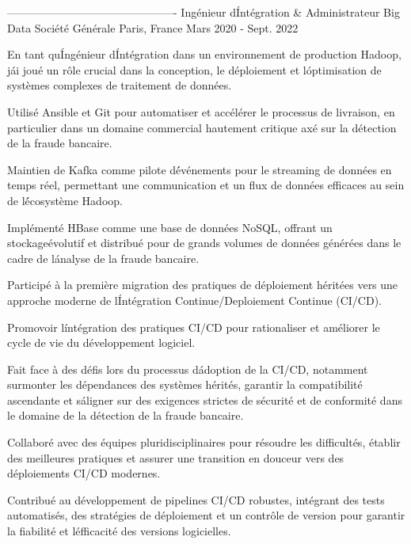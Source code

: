 \begin{cventries}
----------------------------------------------
  \cventry
    {Ingénieur d\' Intégration \& Administrateur Big Data} %
    {Société Générale} %
    {Paris, France} %
    {Mars 2020 - Sept. 2022} %
    {
      \begin{cvitems} %
        \item {En tant qu\' Ingénieur d\' Intégration dans un environnement de production Hadoop, j\' ai joué un rôle crucial dans la conception, le déploiement et l\' optimisation de systèmes complexes de traitement de données.}
        \item {Utilisé Ansible et Git pour automatiser et accélérer le processus de livraison, en particulier dans un domaine commercial hautement critique axé sur la détection de la fraude bancaire.}
        \item {Maintien de Kafka comme pilote d\' événements pour le streaming de données en temps réel, permettant une communication et un flux de données efficaces au sein de l\' écosystème Hadoop.}
        \item {Implémenté HBase comme une base de données NoSQL, offrant un stockageévolutif et distribué pour de grands volumes de données générées dans le cadre de l\' analyse de la fraude bancaire.}
        \item {Participé à la première migration des pratiques de déploiement héritées vers une approche moderne de l\' Intégration Continue/Deploiement Continue (CI/CD).}
        \item {Promovoir l\' intégration des pratiques CI/CD pour rationaliser et améliorer le cycle de vie du développement logiciel.}
        \item {Fait face à des défis lors du processus d\' adoption de la CI/CD, notamment surmonter les dépendances des systèmes hérités, garantir la compatibilité ascendante et s\' aligner sur des exigences strictes de sécurité et de conformité dans le domaine de la détection de la fraude bancaire.}
        \item {Collaboré avec des équipes pluridisciplinaires pour résoudre les difficultés, établir des meilleures pratiques et assurer une transition en douceur vers des déploiements CI/CD modernes.}
        \item {Contribué au développement de pipelines CI/CD robustes, intégrant des tests automatisés, des stratégies de déploiement et un contrôle de version pour garantir la fiabilité et l\' efficacité des versions logicielles.}
      \end{cvitems}
      
}
\end{cventries}
